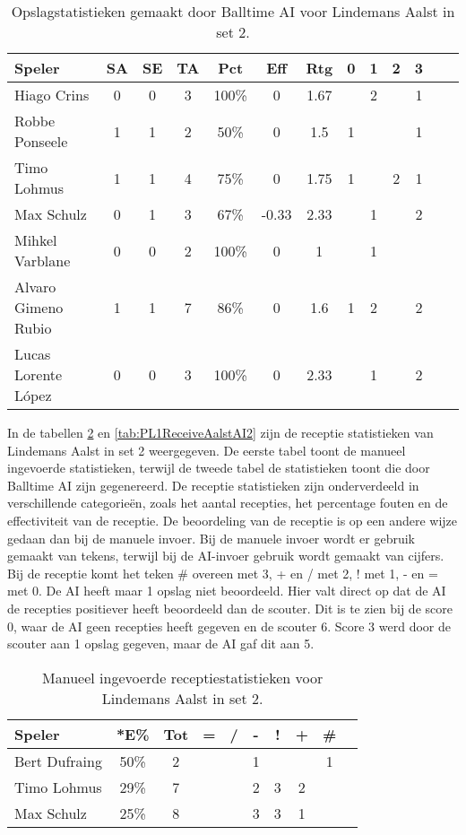 \begin{table}[ht!]
  \centering
  \scriptsize
  \begin{tabular}{|l|c|c|c|c|c|c|c|c|c|c|c|c|} \hline
    \textbf{Speler} & SA & SE & TA & Pct & Eff & Rtg & 0 & 1 & 2 & 3 \\ \hline
    Hiago Crins & 0 & 0 & 3 & 100\% & 0 & 1.67 &  & 2 &  & 1 \\
    Robbe Ponseele & 1 & 1 & 2 & 50\% & 0 & 1.5 & 1 &  &  & 1  \\
    Timo Lohmus & 1 & 1 & 4 & 75\% & 0 & 1.75 & 1 & & 2 & 1 \\
    Max Schulz & 0 & 1 & 3 & 67\% & -0.33 & 2.33 &  & 1 &  & 2 \\
    Mihkel Varblane & 0 & 0 & 2 & 100\% & 0 & 1 &  & 1 &  &   \\
    Alvaro Gimeno Rubio & 1 & 1 & 7 & 86\% & 0 & 1.6 & 1 & 2 &  & 2  \\
    Lucas Lorente López & 0 & 0 & 3 & 100\% & 0 & 2.33 &  & 1 &  & 2  \\ \hline
  \end{tabular}
  \caption[Opslagstatistieken gemaakt door Balltime AI voor Lindemans Aalst in set 2]{\label{tab:PL1ServeAalstAI2}Opslagstatistieken gemaakt door Balltime AI voor Lindemans Aalst in set 2.}
\end{table}

In de tabellen \ref{tab:PL1ReceiveAalstMan2} en \ref{tab:PL1ReceiveAalstAI2} zijn de receptie statistieken van Lindemans Aalst in set 2 weergegeven. De eerste tabel toont de manueel ingevoerde statistieken, terwijl de tweede tabel de statistieken toont die door Balltime AI zijn gegenereerd. De receptie statistieken zijn onderverdeeld in verschillende categorieën, zoals het aantal recepties, het percentage fouten en de effectiviteit van de receptie. De beoordeling van de receptie is op een andere wijze gedaan dan bij de manuele invoer. Bij de manuele invoer wordt er gebruik gemaakt van tekens, terwijl bij de AI-invoer gebruik wordt gemaakt van cijfers. Bij de receptie komt het teken \# overeen met 3, + en / met 2, ! met 1, - en = met 0. De AI heeft maar 1 opslag niet beoordeeld. Hier valt direct op dat de AI de recepties positiever heeft beoordeeld dan de scouter. Dit is te zien bij de score 0, waar de AI geen recepties heeft gegeven en de scouter 6. Score 3 werd door de scouter aan 1 opslag gegeven, maar de AI gaf dit aan 5.

\begin{table}[ht!]
  \centering
  \scriptsize
    \begin{tabular}{|l|c|c|c|c|c|c|c|c|c|}
      \hline
      \textbf{Speler} & *E\% & Tot & = & / & - & ! & + & \# \\ \hline
      Bert Dufraing  & 50\% & 2 &  &  & 1 &  &  & 1 \\ 
      Timo Lohmus  & 29\% & 7 &  & & 2 & 3 & 2 &    \\
      Max Schulz  & 25\% & 8 &  &  & 3 & 3 & 1 &   \\ \hline
  \end{tabular}
  \caption[Manueel ingevoerde receptiestatistieken voor Lindemans Aalst in set 2]{\label{tab:PL1ReceiveAalstMan2}Manueel ingevoerde receptiestatistieken voor Lindemans Aalst in set 2.}
\end{table}


